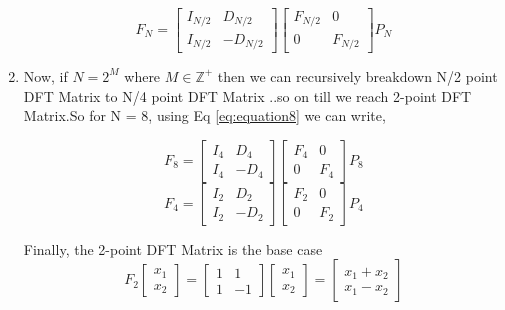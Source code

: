 \documentclass[journal,12pt,twocolumn]{IEEEtran}
\renewcommand\thesection{\arabic{section}}
\begin{document}
\begin{enumerate}[label=\thesection.\arabic*.,ref=\thesection.\theenumi]
\begin{equation} 
F_{N}
=
\begin{bmatrix}
I_{N/2} & D_{N/2} \\
I_{N/2} & -D_{N/2}
\end{bmatrix}
\begin{bmatrix}
F_{N/2} & 0 \\
0 & F_{N/2}
\end{bmatrix}
P_{N}
\label{eq:equation8}
\end{equation}

\item Now, if $N = 2^{M}$ where $M \in \mathbb{Z^{+}}$  then we can recursively breakdown N/2 point DFT Matrix to N/4 point DFT Matrix ..so on till we reach 2-point DFT Matrix.So for N = 8, using Eq \eqref{eq:equation8} we can write,

\begin{equation}
F_{8}=
\begin{bmatrix}
I_{4} & D_{4} \\
I_{4} & -D_{4}
\end{bmatrix}
\begin{bmatrix}
F_{4} & 0 \\
0 & F_{4}
\end{bmatrix}
P_{8}
\end{equation}
\begin{equation}
F_{4}=
\begin{bmatrix}
I_{2} & D_{2} \\
I_{2} & -D_{2}
\end{bmatrix}
\begin{bmatrix}
F_{2} & 0 \\
0 & F_{2}
\end{bmatrix}
P_{4}
\end{equation}

Finally, the 2-point DFT Matrix is the base case 
\begin{equation}
F_{2}
\begin{bmatrix}
x_{1} \\
x_{2}
\end{bmatrix}
=
\begin{bmatrix}
1 & 1 \\
1 & -1
\end{bmatrix}
\begin{bmatrix}
x_{1} \\
x_{2}
\end{bmatrix}
=
\begin{bmatrix}
x_{1}+x_{2} \\
x_{1}-x_{2}
\end{bmatrix}
\end{equation}



\end{enumerate}
\end{document}
